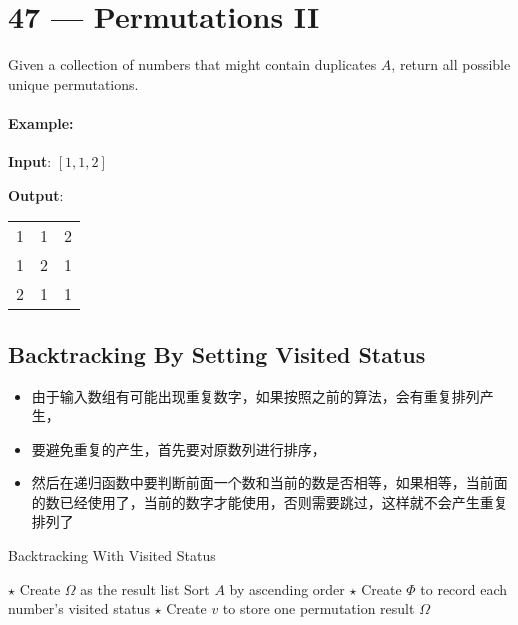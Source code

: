 \section{47 --- Permutations II}

Given a collection of numbers that might contain duplicates $A$, return all possible unique permutations.

\paragraph{Example:}

\begin{flushleft}
\textbf{Input}: $[1,1,2]$

\textbf{Output}:

\begin{table}[H]
\begin{tabular}{ccc}
1 & 1 & 2\\
1 & 2 & 1\\
2 & 1 & 1
\end{tabular}
\end{table}
\end{flushleft}

\subsection{Backtracking By Setting Visited Status}
\begin{itemize}
\item 由于输入数组有可能出现重复数字，如果按照之前的算法，会有重复排列产生，
\item 要避免重复的产生，首先要对原数列进行排序，
\item 然后在递归函数中要判断前面一个数和当前的数是否相等，如果相等，当前面的数已经使用了，当前的数字才能使用，否则需要跳过，这样就不会产生重复排列了
\end{itemize}

\setcounter{algorithm}{0}
\begin{algorithm}[H]
\caption{Backtracking With Visited Status}
\begin{algorithmic}[1]
\State $\star$ Create $\Omega$ as the result list
\State Sort $A$ by ascending order
\State $\star$ Create $\Phi$ to record each number's visited status
\State $\star$ Create $v$ to store one permutation result
\State {} 
\State \Return $\Omega$
\EndProcedure
\end{algorithmic}
\end{algorithm}

